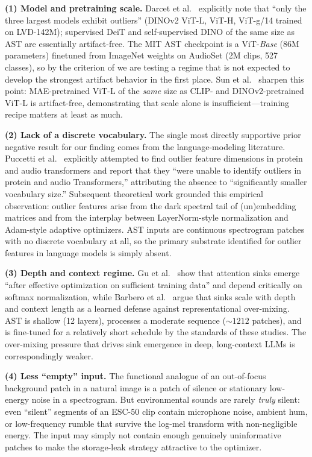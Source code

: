 \documentclass[conference]{IEEEtran}
\begin{document}
\textbf{(1) Model and pretraining scale.} Darcet et al.\ \cite{darcet2024need} explicitly note that ``only the three largest models exhibit outliers'' (DINOv2 ViT-L, ViT-H, ViT-g/14 trained on LVD-142M); supervised DeiT and self-supervised DINO of the same size as AST are essentially artifact-free. The MIT AST checkpoint is a ViT-\emph{Base} ($86$M parameters) finetuned from ImageNet weights on AudioSet (2M clips, 527 classes), so by the criterion of \cite{darcet2024need} we are testing a regime that is not expected to develop the strongest artifact behavior in the first place. Sun et al.\ \cite{sun2024massive} sharpen this point: MAE-pretrained ViT-L of the \emph{same} size as CLIP- and DINOv2-pretrained ViT-L is artifact-free, demonstrating that scale alone is insufficient---training recipe matters at least as much.

\textbf{(2) Lack of a discrete vocabulary.} The single most directly supportive prior negative result for our finding comes from the language-modeling literature. Puccetti et al.\ \cite{puccetti2022outlier} explicitly attempted to find outlier feature dimensions in protein and audio transformers and report that they ``were unable to identify outliers in protein and audio Transformers,'' attributing the absence to ``significantly smaller vocabulary size.'' Subsequent theoretical work \cite{cancedda2024spectral,he2024outliers} grounded this empirical observation: outlier features arise from the dark spectral tail of (un)embedding matrices and from the interplay between LayerNorm-style normalization and Adam-style adaptive optimizers. AST inputs are continuous spectrogram patches with no discrete vocabulary at all, so the primary substrate identified for outlier features in language models is simply absent.

\textbf{(3) Depth and context regime.} Gu et al.\ \cite{gu2025emergence} show that attention sinks emerge ``after effective optimization on sufficient training data'' and depend critically on softmax normalization, while Barbero et al.\ \cite{barbero2025firsttoken} argue that sinks scale with depth and context length as a learned defense against representational over-mixing. AST is shallow (12 layers), processes a moderate sequence ($\sim 1212$ patches), and is fine-tuned for a relatively short schedule by the standards of these studies. The over-mixing pressure that drives sink emergence in deep, long-context LLMs is correspondingly weaker.

\textbf{(4) Less ``empty'' input.} The functional analogue of an out-of-focus background patch in a natural image is a patch of silence or stationary low-energy noise in a spectrogram. But environmental sounds are rarely \emph{truly} silent: even ``silent'' segments of an ESC-50 clip contain microphone noise, ambient hum, or low-frequency rumble that survive the log-mel transform with non-negligible energy. The input may simply not contain enough genuinely uninformative patches to make the storage-leak strategy attractive to the optimizer.
\end{document}
